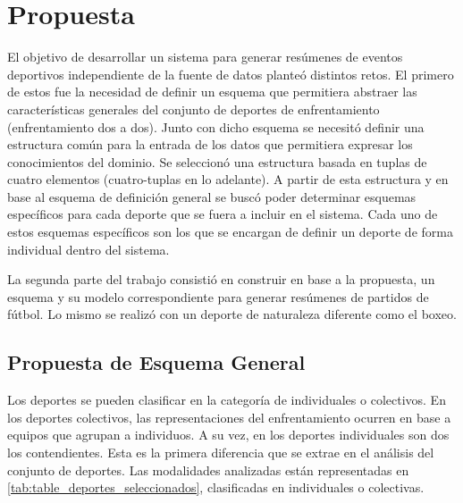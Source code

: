 \chapter{Propuesta}\label{chapter:proposal}
 
    El objetivo de desarrollar un sistema para generar resúmenes de eventos deportivos independiente de la fuente de datos 
planteó distintos retos. El primero de estos fue la necesidad de definir un esquema que permitiera abstraer las características 
generales del conjunto de deportes de enfrentamiento (enfrentamiento dos a dos). Junto con dicho esquema se necesitó 
definir una estructura común para la entrada de los datos que permitiera expresar los conocimientos del dominio. Se seleccionó 
una estructura basada en tuplas de cuatro elementos (cuatro-tuplas en lo adelante). A partir de esta estructura y en base 
al esquema de definición general se buscó poder determinar esquemas específicos para cada deporte que se fuera a incluir en el 
sistema. Cada uno de estos esquemas específicos son los que se encargan de definir un deporte de forma individual dentro del sistema.
    
    La segunda parte del trabajo consistió en construir en base a la propuesta, un esquema y su modelo correspondiente para generar 
resúmenes de partidos de fútbol. Lo mismo se realizó con un deporte de naturaleza diferente como el boxeo.

\section{Propuesta de Esquema General}

    Los deportes se pueden clasificar en la categoría de individuales o colectivos. En los deportes colectivos, las representaciones 
del enfrentamiento ocurren en base a equipos que agrupan a individuos. A su vez, en los deportes individuales son dos los contendientes.
Esta es la primera diferencia que se extrae en el análisis del conjunto de deportes. Las modalidades analizadas están representadas en \ref{tab:table_deportes_seleccionados}, 
clasificadas en individuales o colectivas.

